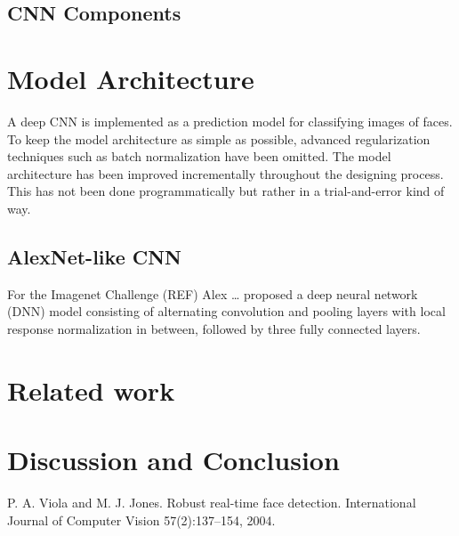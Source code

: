 \documentclass[twoside]{article}
\begin{document}
\begin{multicols}{2}
\subsection{CNN Components}



\section{Model Architecture}
A deep CNN is implemented as a prediction model for classifying images of faces. To keep the model architecture as simple as possible, advanced regularization techniques such as batch normalization have been omitted. The model architecture has been improved incrementally throughout the designing process. This has not been done programmatically but rather in a trial-and-error kind of way.

\subsection{AlexNet-like CNN}
For the Imagenet Challenge (REF) Alex … proposed a deep neural network (DNN) model consisting of alternating convolution and pooling layers with local response normalization in between, followed by three fully connected layers. 


\section{Related work}



\section{Discussion and Conclusion}





\begin{thebibliography}{9}

  	P. A. Viola and M. J. Jones. Robust real-time face detection.
	International Journal of Computer Vision
	57(2):137–154, 2004.


\end{thebibliography}
\end{multicols}
\end{document}
